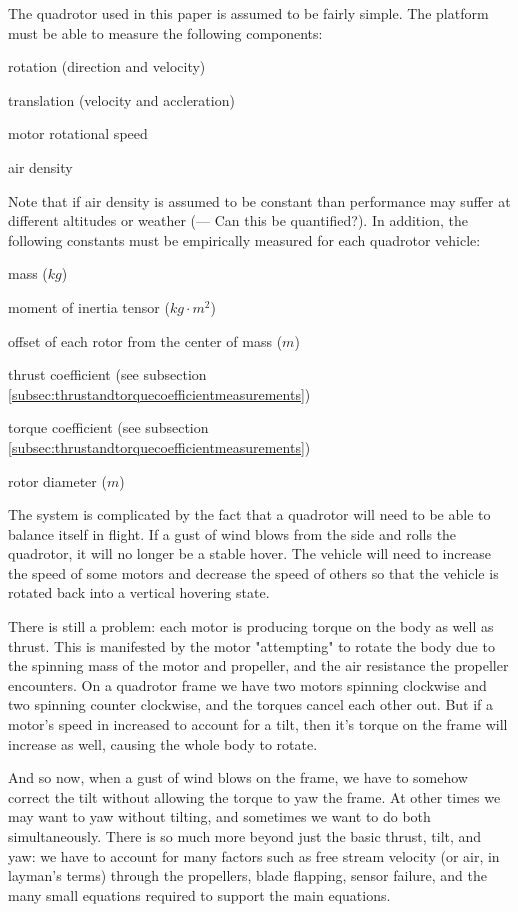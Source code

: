 \documentclass{article}
\numberwithin{equation}{section} %
\begin{document}
The quadrotor used in this paper is assumed to be fairly simple. The platform must be able to measure the following components:
\begin{list}{*}{}
	\item rotation (direction and velocity)
	\item translation (velocity and accleration)
	\item motor rotational speed
	\item air density
\end{list}
Note that if air density is assumed to be constant than performance may suffer at different altitudes or weather (--- Can this be quantified?). In addition, the following constants must be empirically measured for each quadrotor vehicle:
\begin{list}{*}{}
	\item mass ($kg$)
	\item moment of inertia tensor ($kg \cdot m^2$)
	\item offset of each rotor from the center of mass ($m$)
	\item thrust coefficient (see subsection \ref{subsec:thrustandtorquecoefficientmeasurements})
	\item torque coefficient (see subsection \ref{subsec:thrustandtorquecoefficientmeasurements})
	\item rotor diameter ($m$)
\end{list}

The system is complicated by the fact that a quadrotor will need to be able to balance itself in flight. If a gust of wind blows from the side and rolls the quadrotor, it will no longer be a stable hover. The vehicle will need to increase the speed of some motors and decrease the speed of others so that the vehicle is rotated back into a vertical hovering state.

There is still a problem: each motor is producing torque on the body as well as thrust. This is manifested by the motor "attempting" to rotate the body due to the spinning mass of the motor and propeller, and the air resistance the propeller encounters. On a quadrotor frame we have two motors spinning clockwise and two spinning counter clockwise, and the torques cancel each other out. But if a motor's speed in increased to account for a tilt, then it's torque on the frame will increase as well, causing the whole body to rotate.

And so now, when a gust of wind blows on the frame, we have to somehow correct the tilt without allowing the torque to yaw the frame. At other times we may want to yaw without tilting, and sometimes we want to do both simultaneously.  There is so much more beyond just the basic thrust, tilt, and yaw: we have to account for many factors such as free stream velocity (or air, in layman's terms) through the propellers, blade flapping, sensor failure, and the many small equations required to support the main equations.
\end{document}
